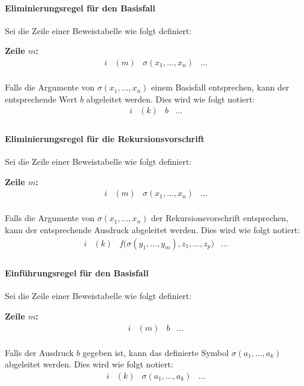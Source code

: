 \documentclass[main.tex]{subfiles}
\begin{document}
\paragraph{Eliminierungsregel für den Basisfall}
Sei die Zeile einer Beweistabelle wie folgt definiert:

\textbf{Zeile \(m\):}
\[
\begin{array}{llll}
   i & (m) & \sigma(x_1, \ldots, x_n) & \dots \\
\end{array}
\]

Falls die Argumente von \(\sigma(x_1, \ldots, x_n)\) einem Basisfall entsprechen, kann der entsprechende Wert \(b\) abgeleitet werden. Dies wird wie folgt notiert:
\[
\begin{array}{llll}
   i & (k) & b & ... \\
\end{array}
\]

\paragraph{Eliminierungsregel für die Rekursionsvorschrift}
Sei die Zeile einer Beweistabelle wie folgt definiert:

\textbf{Zeile \(m\):}
\[
\begin{array}{llll}
   i & (m) & \sigma(x_1, \ldots, x_n) & \dots \\
\end{array}
\]

Falls die Argumente von \(\sigma(x_1, \ldots, x_n)\) der Rekursionsvorschrift entsprechen, kann der entsprechende Ausdruck abgeleitet werden. Dies wird wie folgt notiert:
\[
\begin{array}{llll}
   i & (k) & f\big(\sigma(y_1, \ldots, y_m), z_1, \ldots, z_p\big) & ... \\
\end{array}
\]

\paragraph{Einführungsregel für den Basisfall}
Sei die Zeile einer Beweistabelle wie folgt definiert:

\textbf{Zeile \(m\):}
\[
\begin{array}{llll}
   i & (m) & b & \dots \\
\end{array}
\]

Falls der Ausdruck \(b\) gegeben ist, kann das definierte Symbol \(\sigma(a_1, \ldots, a_k)\) abgeleitet werden. Dies wird wie folgt notiert:
\[
\begin{array}{llll}
   i & (k) & \sigma(a_1, \ldots, a_k) & ... \\
\end{array}
\]
\end{document}
